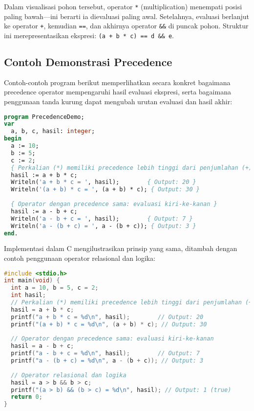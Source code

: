 \documentclass[../main.tex]{subfiles}
\begin{document}
Dalam visualisasi pohon tersebut, operator \texttt{*} (multiplication) menempati posisi paling bawah—ini berarti ia dievaluasi paling awal. Setelahnya, evaluasi berlanjut ke operator \texttt{+}, kemudian \texttt{==}, dan akhirnya operator \texttt{\&\&} di puncak pohon. Struktur ini merepresentasikan ekspresi: \texttt{(a + b * c) == d \&\& e}.

\subsection{Contoh Demonstrasi Precedence}

Contoh-contoh program berikut memperlihatkan secara konkret bagaimana precedence operator mempengaruhi hasil evaluasi ekspresi, serta bagaimana penggunaan tanda kurung dapat mengubah urutan evaluasi dan hasil akhir:

\begin{lstlisting}[language=Pascal, caption={Precedence operator di Pascal}]
program PrecedenceDemo;
var
  a, b, c, hasil: integer;
begin
  a := 10;
  b := 5;
  c := 2;
  { Perkalian (*) memiliki precedence lebih tinggi dari penjumlahan (+) }
  hasil := a + b * c;
  Writeln('a + b * c = ', hasil);        { Output: 20 }
  Writeln('(a + b) * c = ', (a + b) * c); { Output: 30 }
  
  { Operator dengan precedence sama: evaluasi kiri-ke-kanan }
  hasil := a - b + c;
  Writeln('a - b + c = ', hasil);        { Output: 7 }
  Writeln('a - (b + c) = ', a - (b + c)); { Output: 3 }
end.
\end{lstlisting}

Implementasi dalam C mengilustrasikan prinsip yang sama, ditambah dengan contoh penggunaan operator relasional dan logika:

\begin{lstlisting}[language=C, caption={Precedence operator di C}]
#include <stdio.h>
int main(void) {
  int a = 10, b = 5, c = 2;
  int hasil;
  // Perkalian (*) memiliki precedence lebih tinggi dari penjumlahan (+)
  hasil = a + b * c;
  printf("a + b * c = %d\n", hasil);        // Output: 20
  printf("(a + b) * c = %d\n", (a + b) * c); // Output: 30
  
  // Operator dengan precedence sama: evaluasi kiri-ke-kanan
  hasil = a - b + c;
  printf("a - b + c = %d\n", hasil);        // Output: 7
  printf("a - (b + c) = %d\n", a - (b + c)); // Output: 3
  
  // Operator relasional dan logika
  hasil = a > b && b > c;
  printf("(a > b) && (b > c) = %d\n", hasil); // Output: 1 (true)
  return 0;
}
\end{lstlisting}
\end{document}
